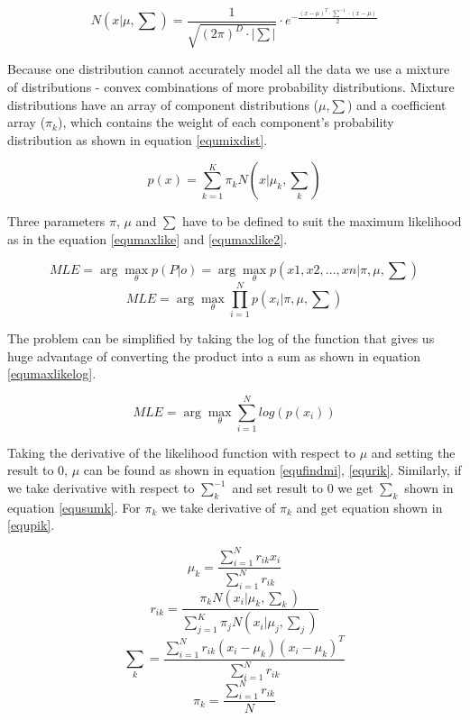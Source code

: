 \documentclass[conference]{IEEEtran}
\begin{document}
\begin{equation}\label{equgauss}
	N(x|\mu,\sum) = \frac{1}{\sqrt{(2\pi)^D \cdot |\sum|}} \cdot e^{-\frac{(x-\mu)^T \cdot \sum^{-1} \cdot (x-\mu)}{2}}
\end{equation}

Because one distribution cannot accurately model all the data we use a mixture of distributions - convex
combinations of more probability distributions. Mixture distributions have an array of component distributions
($\mu$,$\sum$) and a coefficient array ($\pi_k$), which contains the weight of each component's probability distribution
as shown in equation \ref{equmixdist}.

\begin{equation}\label{equmixdist}
	p(x) = \sum_{k=1}^K {\pi_k N(x|\mu_k, {\sum}_k)}
\end{equation}

Three parameters $\pi$, $\mu$ and $\sum$ have to be defined to suit the maximum likelihood as in the equation \ref{equmaxlike}
and \ref{equmaxlike2}.

\begin{equation}\label{equmaxlike}
	MLE=\arg\max_\theta {p(P|o)} = \arg\max_\theta {p({x1,x2,...,xn}|\pi,\mu,\sum)}
\end{equation}
\begin{equation}\label{equmaxlike2}
	MLE = \arg\max_\theta {\prod_{i=1}^N p(x_i|\pi,\mu,\sum)}
\end{equation}

The problem can be simplified by taking the log of the function that gives us huge advantage of converting the
product into a sum as shown in equation \ref{equmaxlikelog}.

\begin{equation}\label{equmaxlikelog}
	MLE=\arg\max_\theta {\sum_{i=1}^N log(p(x_i))}
\end{equation}

Taking the derivative of the likelihood function with respect to $\mu$ and setting the result to 0, $\mu$ can be found as
shown in equation \ref{equfindmi}, \ref{equrik}. Similarly, if we take derivative with respect to $\sum_k^{-1}$ and set
result to 0 we get $\sum_k$ shown in equation \ref{equsumk}. For $\pi_k$ we take derivative of $\pi_k$ and get equation
shown in \ref{equpik}.

\begin{equation}\label{equfindmi}
	\mu_k = \frac {\sum_{i=1}^N r_{ik} x_i} {\sum_{i=1}^N r_{ik}}
\end{equation}
\begin{equation}\label{equrik}
	r_{ik} = \frac {\pi_k N(x_i|\mu_k,{\sum}_k)} {\sum_{j=1}^K \pi_j N(x_i|\mu_j,{\sum}_j)}
\end{equation}
\begin{equation}\label{equsumk}
	 {\sum}_k = \frac {\sum_{i=1}^N r_{ik} (x_i-\mu_k) (x_i-\mu_k)^T} {\sum_{i=1}^N r_{ik}}
\end{equation}
\begin{equation}\label{equpik}
	\pi_k=\frac {\sum_{i=1}^N r_{ik}} {N}
\end{equation}
\end{document}
